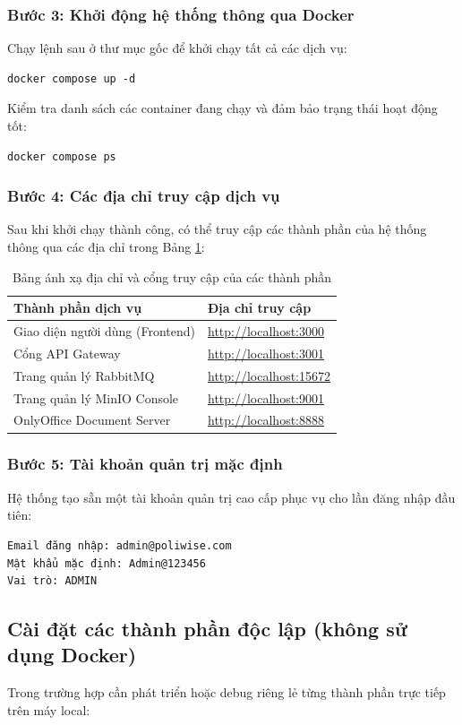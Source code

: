 \documentclass[12pt,a4paper]{report}
\begin{document}
\subsubsection{Bước 3: Khởi động hệ thống thông qua Docker}
Chạy lệnh sau ở thư mục gốc để khởi chạy tất cả các dịch vụ:
\begin{verbatim}
docker compose up -d
\end{verbatim}
Kiểm tra danh sách các container đang chạy và đảm bảo trạng thái hoạt động tốt:
\begin{verbatim}
docker compose ps
\end{verbatim}

\subsubsection{Bước 4: Các địa chỉ truy cập dịch vụ}
Sau khi khởi chạy thành công, có thể truy cập các thành phần của hệ thống thông qua các địa chỉ trong Bảng \ref{tab:port_mappings}:
\begin{table}[H]
\centering
\caption{Bảng ánh xạ địa chỉ và cổng truy cập của các thành phần}
\label{tab:port_mappings}
\begin{tabularx}{\textwidth}{|l|X|}
\hline
\rowcolor{gray!10}
Thành phần dịch vụ & Địa chỉ truy cập \\ \hline
Giao diện người dùng (Frontend) & \url{http://localhost:3000} \\ \hline
Cổng API Gateway & \url{http://localhost:3001} \\ \hline
Trang quản lý RabbitMQ & \url{http://localhost:15672} \\ \hline
Trang quản lý MinIO Console & \url{http://localhost:9001} \\ \hline
OnlyOffice Document Server & \url{http://localhost:8888} \\ \hline
\end{tabularx}
\end{table}

\subsubsection{Bước 5: Tài khoản quản trị mặc định}
Hệ thống tạo sẵn một tài khoản quản trị cao cấp phục vụ cho lần đăng nhập đầu tiên:
\begin{verbatim}
Email đăng nhập: admin@poliwise.com
Mật khẩu mặc định: Admin@123456
Vai trò: ADMIN
\end{verbatim}

\subsection{Cài đặt các thành phần độc lập (không sử dụng Docker)}
Trong trường hợp cần phát triển hoặc debug riêng lẻ từng thành phần trực tiếp trên máy local:
\end{document}
